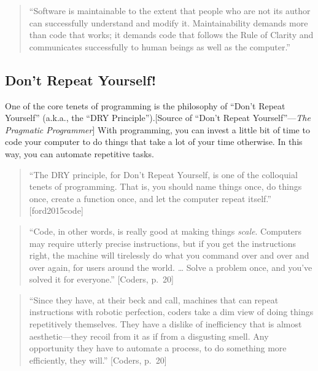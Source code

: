 \documentclass[]{tufte-book}
\begin{document}
\begin{quote}
``Software is maintainable to the extent that people who are not its author can
successfully understand and modify it. Maintainability demands more than code that
works; it demands code that follows the Rule of Clarity and communicates successfully
to human beings as well as the computer.'' \citep{raymond2003art}
\end{quote}

\hypertarget{dont-repeat-yourself}{%
\subsection{Don't Repeat Yourself!}\label{dont-repeat-yourself}}

One of the core tenets of programming is the philosophy of ``Don't Repeat
Yourself'' (a.k.a., the ``DRY Principle'').{[}Source of ``Don't Repeat
Yourself''---\emph{The Pragmatic Programmer}{]} With programming, you can invest a
little bit of time to code your computer to do things that take a lot of your
time otherwise. In this way, you can automate repetitive tasks.

\begin{quote}
``The DRY principle, for Don't Repeat Yourself, is one of the colloquial tenets
of programming. That is, you should name things once, do things once, create a
function once, and let the computer repeat itself.'' {[}ford2015code{]}
\end{quote}

\begin{quote}
``Code, in other words, is really good at making things \emph{scale}. Computers
may require utterly precise instructions, but if you get the instructions
right, the machine will tirelessly do what you command over and over and
over again, for users around the world. \ldots{} Solve a problem once, and you've
solved it for everyone.'' {[}Coders, p.~20{]}
\end{quote}

\begin{quote}
``Since they have, at their beck and call, machines that can repeat
instructions with robotic perfection, coders take a dim view of doing
things repetitively themselves. They have a dislike of inefficiency
that is almost aesthetic---they recoil from it as if from a disgusting
smell. Any opportunity they have to automate a process, to do something
more efficiently, they will.'' {[}Coders, p.~20{]}
\end{quote}
\end{document}
